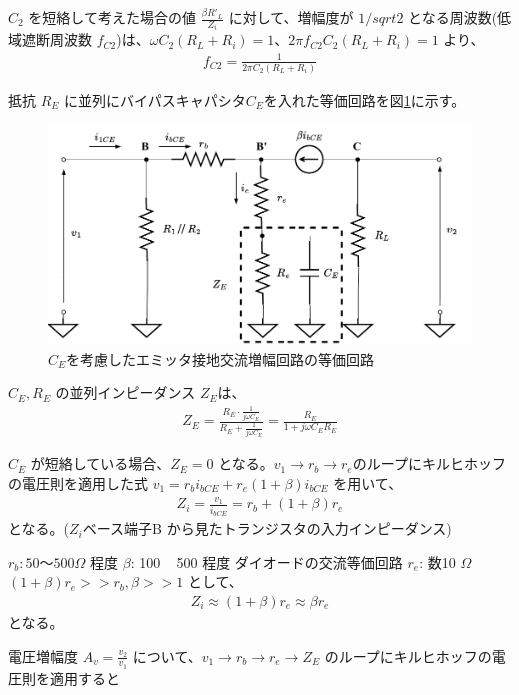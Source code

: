 $C_2$ を短絡して考えた場合の値 $\frac{\beta R'_L}{Z_i}$ に対して、増幅度が $1/sqrt{2}$ となる周波数(低域遮断周波数 $f_{C2}$)は、$\omega C_2(R_L+R_i) = 1$、$2\pi f_{C2} C_2(R_L+R_i) = 1$ より、
\begin{align}
  f_{C2} = \frac{1}{2\pi C_2(R_L+R_i)}  
\end{align}

抵抗 $R_E$ に並列にバイパスキャパシタ$C_E$を入れた等価回路を図\ref{ce}に示す。
\begin{figure}[htbp]
  \begin{center}
  \includegraphics[width=0.8\linewidth]{img/51.pdf}
  \caption{$C_E$を考慮したエミッタ接地交流増幅回路の等価回路}
  \label{ce}
  \end{center}
\end{figure}

$C_E, R_E$ の並列インピーダンス $Z_E$は、
\begin{align}
  Z_E = \frac{R_E \cdot \frac{1}{j\omega C_E}}{R_E+\frac{1}{j\omega C_E}} = \frac{R_E}{1+j\omega C_ER_E} \label{ze}
\end{align}

$C_E$ が短絡している場合、$Z_E = 0$ となる。$v_1 \rightarrow r_b \rightarrow r_e$のループにキルヒホッフの電圧則を適用した式 $v_1 = r_bi_{bCE}+r_e(1+\beta)i_{bCE}$ を用いて、
\begin{align}
  Z_i = \frac{v_1}{i_{bCE}} = r_b+(1+\beta)r_e
\end{align}
となる。($Z_i$ベース端子B から見たトランジスタの入力インピーダンス)

$r_b: 50 ～ 500 \Omega$ 程度 $\beta$: 100 ~ 500 程度 ダイオードの交流等価回路 $r_e$: 数10 $\Omega$ $(1+\beta)r_e >> r_b, \beta >> 1$ として、
\begin{align}
  Z_i \approx (1+\beta)r_e \approx \beta r_e \label{zi}
\end{align}
となる。

電圧増幅度 $A_v = \frac{v_2}{v_1}$ について、$v_1 \rightarrow r_b \rightarrow r_e \rightarrow Z_E$ のループにキルヒホッフの電圧則を適用すると

